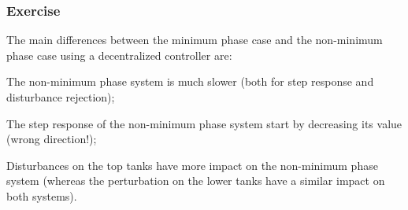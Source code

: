 \subsubsection{Exercise} 

The main differences between the minimum phase case and the non-minimum phase case using a decentralized controller are:
\begin{shortitemize}
    \item The non-minimum phase system is much slower (both for step response and disturbance rejection);
    \item The step response of the non-minimum phase system start by decreasing its value (wrong direction!);
    \item Disturbances on the top tanks have more impact on the non-minimum phase system (whereas the perturbation on the lower tanks have a similar impact on both systems).
\end{shortitemize}

